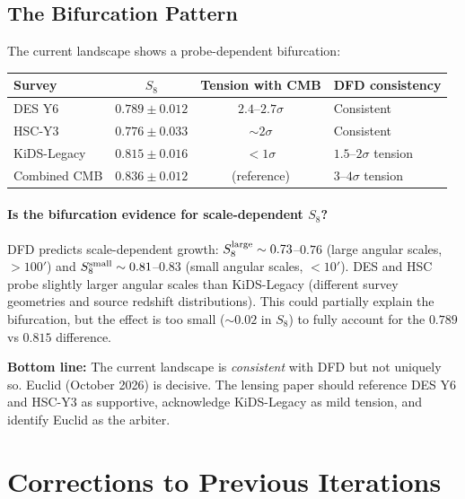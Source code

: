 \documentclass[11pt,a4paper]{article}
\begin{document}
\subsection{The Bifurcation Pattern}

The current landscape shows a probe-dependent bifurcation:

\begin{center}
\begin{tabular}{lccl}
\toprule
Survey & $S_8$ & Tension with CMB & DFD consistency \\
\midrule
DES Y6 & $0.789 \pm 0.012$ & $2.4$--$2.7\sigma$ & Consistent \\
HSC-Y3 & $0.776 \pm 0.033$ & $\sim 2\sigma$ & Consistent \\
KiDS-Legacy & $0.815 \pm 0.016$ & $< 1\sigma$ & $1.5$--$2\sigma$ tension \\
Combined CMB & $0.836 \pm 0.012$ & (reference) & $3$--$4\sigma$ tension \\
\bottomrule
\end{tabular}
\end{center}

\paragraph{Is the bifurcation evidence for scale-dependent $S_8$?}
DFD predicts scale-dependent growth: $S_8^{\rm large} \sim 0.73$--$0.76$
(large angular scales, $> 100'$) and $S_8^{\rm small} \sim 0.81$--$0.83$
(small angular scales, $< 10'$).  DES and HSC probe slightly larger angular
scales than KiDS-Legacy (different survey geometries and source redshift
distributions).  This could partially explain the bifurcation, but the
effect is too small ($\sim 0.02$ in $S_8$) to fully account for the
$0.789$ vs $0.815$ difference.

\textbf{Bottom line:} The current landscape is \emph{consistent} with DFD
but not uniquely so.  Euclid (October 2026) is decisive.  The lensing
paper should reference DES Y6 and HSC-Y3 as supportive, acknowledge
KiDS-Legacy as mild tension, and identify Euclid as the arbiter.


\section*{Corrections to Previous Iterations}
\end{document}
